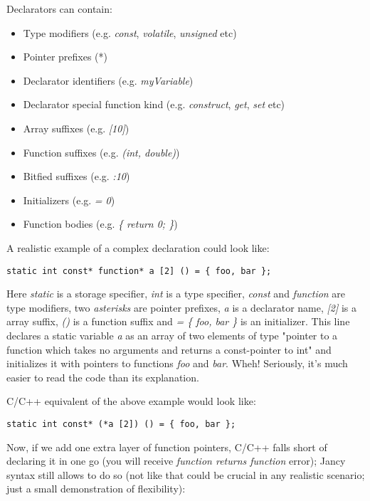 \documentclass[oneside]{book}
\begin{document}
Declarators can contain:
\begin{itemize}
\item Type modifiers (e.g. \emph{const}, \emph{volatile}, \emph{unsigned} etc)
\item Pointer prefixes (*)
\item Declarator identifiers (e.g. \emph{myVariable})
\item Declarator special function kind (e.g. \emph{construct}, \emph{get}, \emph{set} etc)
\item Array suffixes (e.g. \emph{[10]})
\item Function suffixes (e.g. \emph{(int, double)})
\item Bitfied suffixes (e.g. \emph{:10})
\item Initializers (e.g. \emph{= 0})
\item Function bodies  (e.g. \emph{\{ return 0; \}})
\end{itemize}

A realistic example of a complex declaration could look like:

\begin{lstlisting}
static int const* function* a [2] () = { foo, bar };
\end{lstlisting}

Here \emph{static} is a storage specifier, \emph{int} is a type specifier, \emph{const} and \emph{function} are type modifiers, two \emph{asterisks} are pointer prefixes, \emph{a} is a declarator name, \emph{[2]} is a array suffix, \emph{()} is a function suffix and \emph{= \{ foo, bar \}} is an initializer. This line declares a static variable \emph{a} as an array of two elements of type "pointer to a function which takes no arguments and returns a const-pointer to int" and initializes it with pointers to functions \emph{foo} and \emph{bar}. Wheh! Seriously, it's much easier to read the code than its explanation.

C/C++ equivalent of the above example would look like:

\begin{lstlisting}
static int const* (*a [2]) () = { foo, bar };
\end{lstlisting}

Now, if we add one extra layer of function pointers, C/C++ falls short of declaring it in one go (you will receive \emph{function returns function} error); Jancy syntax still allows to do so (not like that could be crucial in any realistic scenario; just a small demonstration of flexibility):
\end{document}
